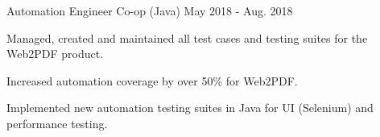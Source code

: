 \begin{cventries}
  \cventry
    {Automation Engineer Co-op (Java)} %
    {} %
    {} %
    {May 2018 - Aug. 2018} %
    {
      \begin{cvitems} %
\item Managed, created and maintained all test cases and testing suites for the Web2PDF product.
\item Increased automation coverage by over 50\% for Web2PDF.
\item Implemented new automation testing suites in Java for UI (Selenium) and performance testing.
      \end{cvitems}
    }

\end{cventries}
